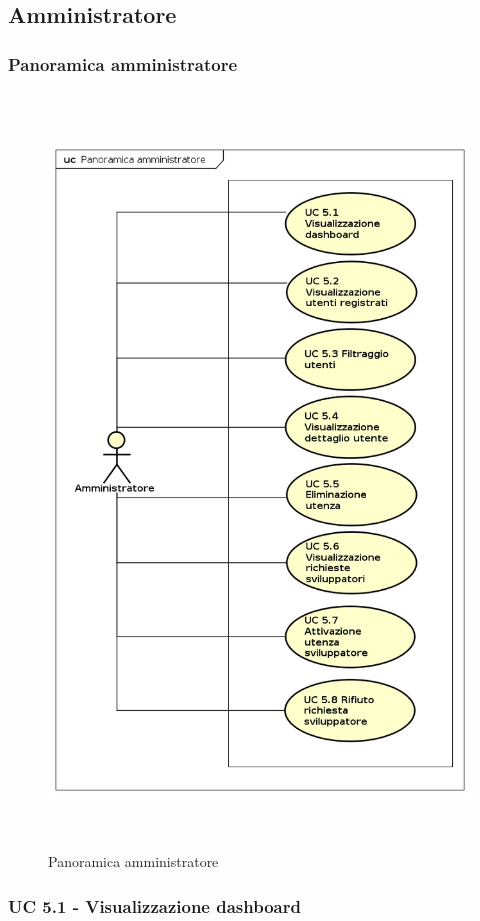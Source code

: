 \subsection{Amministratore}

\subsubsection{Panoramica amministratore}
\begin{figure}[H]
\centering
\includegraphics[width=17cm, height= 20cm]{img/PanoramicaAmministratore.png} 
\caption{Panoramica amministratore}
\end{figure}


\subsubsection{UC 5.1 - Visualizzazione dashboard}

